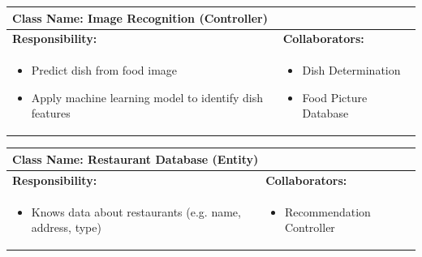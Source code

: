 \documentclass[]{article}
\begin{document}
\begin{table}[H]
	\centering
	\begin{tabular}{|p{7cm}|p{7cm}|}
	\hline 
	 \multicolumn{2}{|l|}{\textbf{Class Name:} Image Recognition (Controller)} \\
	\hline
	\textbf{Responsibility:} & \textbf{Collaborators:} \\
	\hline
	\raggedright
	\begin{itemize}
		\item Predict dish from food image
		\item Apply machine learning model to identify dish features
	\end{itemize}
	\vspace{1in} & 
	\begin{itemize}
		\item Dish Determination
		\item Food Picture Database
	\end{itemize} \\
	\hline
	\end{tabular}
\end{table}


\begin{table}[H]
	\centering
	\begin{tabular}{|p{7cm}|p{7cm}|}
	\hline 
	 \multicolumn{2}{|l|}{\textbf{Class Name:} Restaurant Database (Entity) }\\
	\hline
	\textbf{Responsibility:} & \textbf{Collaborators:} \\
	\hline
	\raggedright
	\begin{itemize}
		\item Knows data about restaurants (e.g. name, address, type)
	\end{itemize}
	\vspace{1in} & 
	\begin{itemize}
		\item Recommendation Controller
	\end{itemize} \\
	\hline
	\end{tabular}
\end{table}
\end{document}
